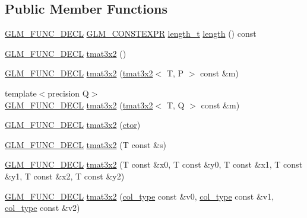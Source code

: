 \subsection*{Public Member Functions}
\begin{DoxyCompactItemize}
\item 
\hyperlink{setup_8hpp_ab2d052de21a70539923e9bcbf6e83a51}{G\+L\+M\+\_\+\+F\+U\+N\+C\+\_\+\+D\+E\+CL} \hyperlink{setup_8hpp_a08b807947b47031d3a511f03f89645ad}{G\+L\+M\+\_\+\+C\+O\+N\+S\+T\+E\+X\+PR} \hyperlink{namespaceglm_a090a0de2260835bee80e71a702492ed9}{length\+\_\+t} \hyperlink{structglm_1_1detail_1_1tmat3x2_a4231ca0190aeb30ea2b544446e735d72}{length} () const
\item 
\hyperlink{setup_8hpp_ab2d052de21a70539923e9bcbf6e83a51}{G\+L\+M\+\_\+\+F\+U\+N\+C\+\_\+\+D\+E\+CL} \hyperlink{structglm_1_1detail_1_1tmat3x2_a4a7242da8dbcc8b72b09689f47424fe1}{tmat3x2} ()
\item 
\hyperlink{setup_8hpp_ab2d052de21a70539923e9bcbf6e83a51}{G\+L\+M\+\_\+\+F\+U\+N\+C\+\_\+\+D\+E\+CL} \hyperlink{structglm_1_1detail_1_1tmat3x2_ad4a1aebc83113727a6ff015cf870fbf3}{tmat3x2} (\hyperlink{structglm_1_1detail_1_1tmat3x2}{tmat3x2}$<$ T, P $>$ const \&m)
\item 
{\footnotesize template$<$precision Q$>$ }\\\hyperlink{setup_8hpp_ab2d052de21a70539923e9bcbf6e83a51}{G\+L\+M\+\_\+\+F\+U\+N\+C\+\_\+\+D\+E\+CL} \hyperlink{structglm_1_1detail_1_1tmat3x2_a293a68738c817050bcccf356d1c36171}{tmat3x2} (\hyperlink{structglm_1_1detail_1_1tmat3x2}{tmat3x2}$<$ T, Q $>$ const \&m)
\item 
\hyperlink{setup_8hpp_ab2d052de21a70539923e9bcbf6e83a51}{G\+L\+M\+\_\+\+F\+U\+N\+C\+\_\+\+D\+E\+CL} \hyperlink{structglm_1_1detail_1_1tmat3x2_a370b3101c031c0789fe0a6fb33f5c13a}{tmat3x2} (\hyperlink{structglm_1_1detail_1_1tmat3x2_ae8783ababf4eb06fdbb048bb90ef3b03}{ctor})
\item 
\hyperlink{setup_8hpp_ab2d052de21a70539923e9bcbf6e83a51}{G\+L\+M\+\_\+\+F\+U\+N\+C\+\_\+\+D\+E\+CL} \hyperlink{structglm_1_1detail_1_1tmat3x2_ab469e328c7d856fc0b999e9bc3c512e8}{tmat3x2} (T const \&s)
\item 
\hyperlink{setup_8hpp_ab2d052de21a70539923e9bcbf6e83a51}{G\+L\+M\+\_\+\+F\+U\+N\+C\+\_\+\+D\+E\+CL} \hyperlink{structglm_1_1detail_1_1tmat3x2_a680eecd8662a43d6f873da7c2577e7a2}{tmat3x2} (T const \&x0, T const \&y0, T const \&x1, T const \&y1, T const \&x2, T const \&y2)
\item 
\hyperlink{setup_8hpp_ab2d052de21a70539923e9bcbf6e83a51}{G\+L\+M\+\_\+\+F\+U\+N\+C\+\_\+\+D\+E\+CL} \hyperlink{structglm_1_1detail_1_1tmat3x2_af83457c3dde2ca170e71eed84c60338c}{tmat3x2} (\hyperlink{structglm_1_1detail_1_1tmat3x2_a9c0f2cfe8e359b2917b5f616a5dbc9e4}{col\+\_\+type} const \&v0, \hyperlink{structglm_1_1detail_1_1tmat3x2_a9c0f2cfe8e359b2917b5f616a5dbc9e4}{col\+\_\+type} const \&v1, \hyperlink{structglm_1_1detail_1_1tmat3x2_a9c0f2cfe8e359b2917b5f616a5dbc9e4}{col\+\_\+type} const \&v2)

\end{DoxyCompactItemize}
